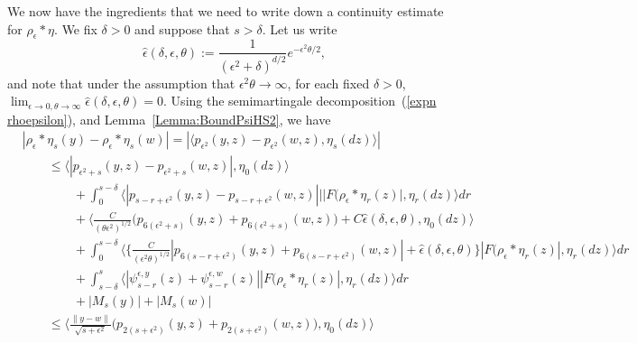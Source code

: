 \documentclass[EJP]{ejpecp} %
\begin{document}
We now have the ingredients that we need to write down a continuity 
estimate for $\rho_\epsilon*\eta$.
We fix $\delta>0$ and 
suppose that $s>\delta$.
Let us write
\[
\widehat{\epsilon}(\delta,\epsilon,\theta):=
\frac{1}{(\epsilon^2+\delta)^{d/2}}
e^{-\epsilon^2\theta/2}, %
\]
and note that under the assumption that $\epsilon^2\theta\to \infty$, for 
each fixed $\delta>0$,  
$\lim_{\epsilon\to 0, \theta\to\infty}
\widehat{\epsilon}(\delta,\epsilon,\theta)=0$. 
Using the semimartingale decomposition~(\ref{expn rhoepsilon}),
and Lemma~\ref{Lemma:BoundPsiHS2},
we have
\begin{align}
& |\rho_\epsilon*\eta_s(y)-\rho_\epsilon*\eta_s(w)| \nonumber 
=
    |\langle p_{\epsilon^2}(y,z)-p_{\epsilon^2}(w,z),\eta_s(dz) \rangle | 
\nonumber
\\ &\qquad
\leq 
\big\langle
    |p_{\epsilon^2+s}(y,z)-p_{\epsilon^2+s}(w,z)|, 
\eta_0(dz) \big\rangle 
\nonumber
\\ &\qquad \qquad {}
+
\int_0^{s-\delta}
    \big\langle |p_{s-r+\epsilon^2}(y,z)-p_{s-r+\epsilon^2}(w,z)||
    |F(\rho_\epsilon*\eta_r(z)|, 
\eta_r(dz) \big\rangle  dr
\nonumber
\\ &\qquad \qquad {}
+
\Big\langle
    \frac{C}{(\theta\epsilon^2)^{1/2}}
    \Big(p_{6(\epsilon^2+s)}(y,z)+p_{6(\epsilon^2+s)}(w,z)\Big)
	+ C\widehat{\epsilon}(\delta,\epsilon,\theta)
,\eta_0(dz) \Big\rangle
\nonumber
\\ &\qquad \qquad {}
+
\int_0^{s-\delta}
\big\langle \Big\{
\frac{C}{(\epsilon^2\theta)^{1/2}}
|p_{6(s-r+\epsilon^2)}(y,z)+
p_{6(s-r+\epsilon^2)}(w,z)| +\widehat{\epsilon}(\delta,\epsilon,\theta)\Big\}
|F(\rho_\epsilon*\eta_r(z)|, 
\eta_r(dz) \big\rangle  dr
\nonumber
    \\ &\qquad \qquad {}
+ \int_{s-\delta}^s \big\langle 
|\psi_{s-r}^{\epsilon,y}(z) + \psi_{s-r}^{\epsilon, w}(z) |
|F(\rho_\epsilon*\eta_r(z)|, 
\eta_r(dz) \big\rangle  dr
\nonumber
\\ & \qquad \qquad {}
+ |M_s(y)|+|M_s(w)| 
\nonumber
\\ & \qquad 
\leq
\Big\langle \frac{\|y-w\|}{\sqrt{s+\epsilon^2}}
    \big(p_{2(s+\epsilon^2)}(y,z)+p_{2(s+\epsilon^2)}(w,z)\big),\eta_0(dz)\Big\rangle

\end{align}
\end{document}
